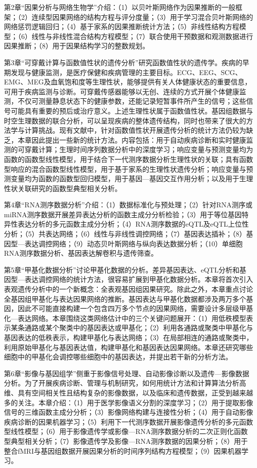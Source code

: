 第2章“因果分析与网络生物学”介绍：（1）以贝叶斯网络作为因果推断的一般框架；（2）连续型因果网络的结构方程与评分度量；（3）用于学习混合贝叶斯网络的网络惩罚逻辑回归；（4）基于家系的因果推断统计方法；（5）非线性结构方程模型；（6）线性与非线性混合结构方程模型；（7）联合使用干预数据和观测数据进行因果推断；（8）用于因果结构学习的整数规划。

第3章“可穿戴计算与函数值性状的遗传分析”研究函数值性状的遗传学。疾病的早期发现与健康监测，是医疗保健和疾病管理的主要目标。ECG、EEG、SCG、EMG、MEG及血氧饱和度等生理性状，能够提供有关人体健康状态的重要信息，可用于疾病监测与诊断。可穿戴传感器能够以无创、连续的方式开展个体健康监测，不仅可测量静息状态下的健康参数，还能记录短暂事件所产生的信号；这些信号可能具有重要的预后或治疗意义。上述生理性状属于函数值性状。基因组数据与时空生理数据的联合分析，可以呈现疾病的整体遗传结构，同时也带来了很大的方法学与计算挑战。现有文献中，针对函数值性状开展遗传分析的统计方法仍较为缺乏，本章因此提出一些新的统计方法。内容包括：用于自动疾病诊断和实时健康监测的可穿戴计算；生理时间序列数据分析中的深度学习；响应变量与预测变量均为函数的函数型线性模型，用于结合下一代测序数据分析生理性状的关联；具有函数型响应的混合函数型线性模型，用于基于家系的生理性状遗传分析；响应变量与预测变量均为函数的函数型回归模型，用于基因—基因交互作用分析；以及用于生理性状关联研究的函数型典型相关分析。

第4章“RNA测序数据分析”介绍：（1）数据标准化与预处理；（2）针对RNA测序或miRNA测序数据开展差异表达分析的函数主成分分析检验；（3）用于等位基因特异性表达分析的多元函数主成分分析；（4）RNA测序数据的eQTL及eQTL上位性分析；（5）共表达网络；（6）线性与非线性调控网络；（7）基因表达插补；（8）基因型—表达调控网络；（9）动态贝叶斯网络与纵向表达数据分析；（10）单细胞RNA测序数据分析、基因表达解卷积与遗传筛查。

第5章“甲基化数据分析”讨论甲基化数据的分析。差异基因表达、eQTL分析和基因型—表达调控网络的统计方法，很容易扩展到甲基化数据分析。本章将首次引入表观遗传分析中的一个新概念：全表观基因组因果研究。除此之外，本章重点讨论全基因组甲基化与表达因果网络的推断。基因表达与甲基化数据都涉及两万多个基因，因此不可能直接构建一个包含四万多个节点的因果网络，需要设计多层级甲基化—表达网络。本章围绕这类网络估计中的三个关键问题展开：（1）用低秩模型表示某条通路或某个聚类中的基因表达或甲基化；（2）利用各通路或聚类中甲基化与基因表达的低秩表示，构建甲基化与表达网络；（3）在局部相连的通路或聚类中，利用原始甲基化与基因表达值，构建甲基化和基因表达因果网络。本章还研究哪些细胞中的甲基化会调控哪些细胞中的基因表达，并提出若干新的分析方法。

第6章“影像与基因组学”侧重于影像信号处理、自动影像诊断以及遗传—影像数据分析。为了开展疾病诊断、管理与机制研究，如何用统计方法和计算算法分析高维、具有空间相关性且结构复杂的影像数据，以及临床和遗传数据，正受到越来越多的关注。本章介绍：（1）用于医学影像语义分割的深度学习；（2）用于提取影像信号的三维函数主成分分析；（3）影像网络构建与连接性分析；（4）用于自动影像疾病诊断的因果机器学习；（5）利用下一代测序数据开展影像遗传分析的多元函数型线性模型；（6）用于影像遗传学或影像—RNA测序数据分析的二次正则化函数型典型相关分析；（7）影像遗传学及影像—RNA测序数据的因果分析；（8）用于整合fMRI与基因组数据开展因果分析的时间序列结构方程模型；（9）因果机器学习。

